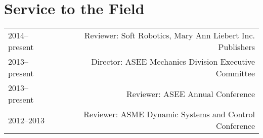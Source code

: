 \section*{Service to the Field}
\begin{tabular}{L!{\VRule}R}
2014--present&Reviewer: Soft Robotics, Mary Ann Liebert Inc. Publishers\\
2013--present&Director: ASEE Mechanics Division Executive Committee\\
2013--present&Reviewer: ASEE Annual Conference\\
2012--2013&Reviewer: ASME Dynamic Systems and Control Conference\\
\end{tabular}
